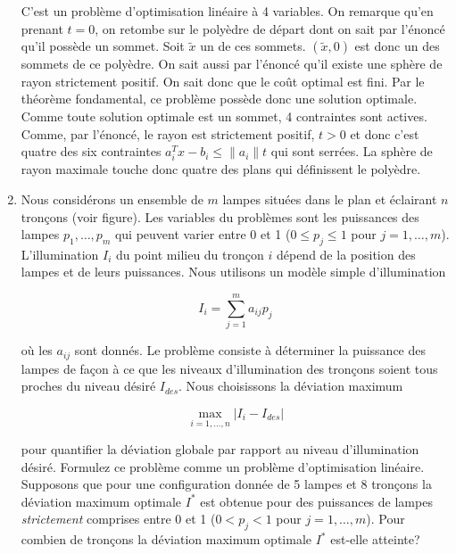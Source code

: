\begin{enumerate}
\begin{solution}
      C'est un problème d'optimisation linéaire à 4 variables.
      On remarque qu'en prenant $t = 0$, on retombe sur le polyèdre
      de départ dont on sait par l'énoncé qu'il possède un sommet.
      Soit $\tilde{x}$ un de ces sommets.
      $(\tilde{x}, 0)$ est donc un des sommets de ce polyèdre.
      On sait aussi par l'énoncé qu'il existe
      une sphère de rayon strictement positif.
      On sait donc que le coût optimal est fini.
      Par le théorème fondamental,
      ce problème possède donc une solution optimale.
      Comme toute solution optimale est un sommet,
      4 contraintes sont actives.
      Comme, par l'énoncé, le rayon est strictement positif,
      $t > 0$ et donc c'est quatre des six contraintes
      $a_i^Tx - b_i \leq \|a_i\|t$ qui sont serrées.
      La sphère de rayon maximale touche donc quatre des
      plans qui définissent le polyèdre.
    \end{solution}

  \item Nous considérons un ensemble de $m$ lampes situées dans le  plan et éclairant $n$
    tronçons (voir figure).  Les variables du problèmes sont les puissances des lampes $p_1, \ldots, p_m$ qui peuvent varier entre 0 et 1 ($0 \leq p_j \leq 1$ pour
    $j=1, \ldots, m$).  L'illumination $I_i$ du point milieu du tronçon $i$ dépend de la position des lampes et de leurs
    puissances. Nous utilisons un modèle simple d'illumination

    $$I_i = \sum_{j=1}^m a_{ij} p_j$$

    où les $a_{ij}$ sont donnés. Le problème consiste à déterminer la puissance des lampes de façon à ce que les niveaux d'illumination des
    tronçons soient tous proches du niveau désiré $I_{des}$. Nous choisissons la déviation maximum

    $$\max_{i=1, \ldots, n} | I_i -I_{des}|$$

    pour quantifier la déviation globale par rapport au niveau d'illumination désiré.  Formulez ce problème comme un problème d'optimisation linéaire. Supposons
    que pour une configuration donnée de 5 lampes et 8 tronçons la déviation maximum optimale  $I^*$ est obtenue pour des puissances de lampes {\it
    strictement}  comprises entre 0 et 1 ($0 < p_j < 1$ pour $j=1, \ldots, m$). Pour combien de tronçons la déviation maximum optimale $I^*$ est-elle atteinte?





    \begin{solution}
      \nosolution
    \end{solution}


\end{enumerate}
